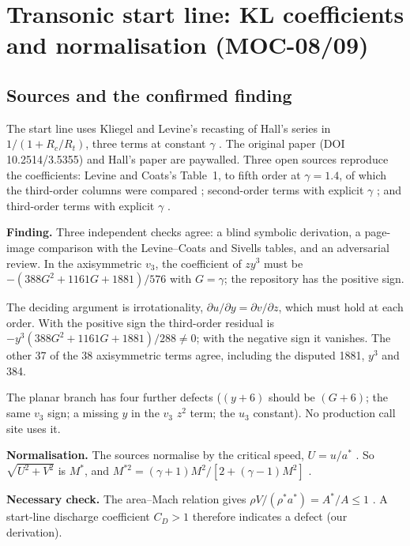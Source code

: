 \section[Transonic start line (MOC-08/09)]{Transonic start line: KL coefficients and normalisation (MOC-08/09)}
\label{sec:kl}
\subsection{Sources and the confirmed finding}
The start line uses Kliegel and Levine's recasting of Hall's series in
$1/(1+R_c/R_t)$, three terms at constant $\gamma$
\cite[PDF p.~2, printed p.~1365]{cuffel1969}. The original paper \cite{kliegel1969}
(DOI 10.2514/3.5355) and Hall's paper \cite{hall1962} are paywalled. Three open sources reproduce the
coefficients: Levine and Coats's Table~1, to fifth order at $\gamma=1.4$, of which the
third-order columns were compared \cite[PDF pp.~38--42, printed pp.~30--34]{levine1970};
second-order terms with explicit $\gamma$ \cite[PDF p.~30, printed p.~4-1,
Eqs.~4-1--4-4]{kliegel1966}; and third-order terms with explicit $\gamma$
\cite[PDF pp.~48--51, printed pp.~45--48, App.~A]{sivells1978}.

\textbf{Finding.} Three independent checks agree: a blind symbolic derivation, a
page-image comparison with the Levine--Coats and Sivells tables, and an adversarial
review. In the axisymmetric $v_3$, the coefficient of $zy^3$ must be
$-(388G^2+1161G+1881)/576$ with $G=\gamma$; the repository has the positive sign.

The deciding argument is irrotationality, $\partial u/\partial y=\partial v/\partial z$,
which must hold at each order. With the positive sign the third-order residual is
$-y^3(388G^2+1161G+1881)/288\neq0$; with the negative sign it vanishes. The other 37
of the 38 axisymmetric terms agree, including the disputed 1881, $y^3$ and 384.

The planar branch has four further defects ($(y+6)$ should be $(G+6)$; the same $v_3$
sign; a missing $y$ in the $v_3$ $z^2$ term; the $u_3$ constant). No production call
site uses it.

\textbf{Normalisation.} The sources normalise by the critical speed, $U=u/a^*$
\cite[PDF p.~7, printed p.~vii]{kliegel1966}. So $\sqrt{U^2+V^2}$ is $M^*$, and
$M^{*2}=(\gamma+1)M^2/[2+(\gamma-1)M^2]$ \cite[PDF p.~98, printed p.~82, Eq.~3.37]{anderson}.

\textbf{Necessary check.} The area--Mach relation gives $\rho V/(\rho^*a^*)=A^*/A\le1$
\cite[PDF p.~220, printed p.~204, Eq.~5.20]{anderson}. A start-line discharge
coefficient $C_D>1$ therefore indicates a defect (our derivation).

